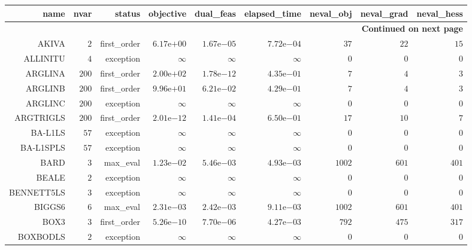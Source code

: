 \begin{longtable}{rrrrrrrrr}
\hline
name & nvar & status & objective & dual\_feas & elapsed\_time & neval\_obj & neval\_grad & neval\_hess \\\hline
\endhead
\hline
\multicolumn{9}{r}{{\bfseries Continued on next page}}\\
\hline
\endfoot
\endlastfoot
AKIVA & \(     2\) & first\_order & \( 6.17\)e\(+00\) & \( 1.67\)e\(-05\) & \( 7.72\)e\(-04\) & \(    37\) & \(    22\) & \(    15\) \\
ALLINITU & \(     4\) & exception & \(\infty\) & \(\infty\) & \(\infty\) & \(     0\) & \(     0\) & \(     0\) \\
ARGLINA & \(   200\) & first\_order & \( 2.00\)e\(+02\) & \( 1.78\)e\(-12\) & \( 4.35\)e\(-01\) & \(     7\) & \(     4\) & \(     3\) \\
ARGLINB & \(   200\) & first\_order & \( 9.96\)e\(+01\) & \( 6.21\)e\(-02\) & \( 4.29\)e\(-01\) & \(     7\) & \(     4\) & \(     3\) \\
ARGLINC & \(   200\) & exception & \(\infty\) & \(\infty\) & \(\infty\) & \(     0\) & \(     0\) & \(     0\) \\
ARGTRIGLS & \(   200\) & first\_order & \( 2.01\)e\(-12\) & \( 1.41\)e\(-04\) & \( 6.50\)e\(-01\) & \(    17\) & \(    10\) & \(     7\) \\
BA-L1LS & \(    57\) & exception & \(\infty\) & \(\infty\) & \(\infty\) & \(     0\) & \(     0\) & \(     0\) \\
BA-L1SPLS & \(    57\) & exception & \(\infty\) & \(\infty\) & \(\infty\) & \(     0\) & \(     0\) & \(     0\) \\
BARD & \(     3\) & max\_eval & \( 1.23\)e\(-02\) & \( 5.46\)e\(-03\) & \( 4.93\)e\(-03\) & \(  1002\) & \(   601\) & \(   401\) \\
BEALE & \(     2\) & exception & \(\infty\) & \(\infty\) & \(\infty\) & \(     0\) & \(     0\) & \(     0\) \\
BENNETT5LS & \(     3\) & exception & \(\infty\) & \(\infty\) & \(\infty\) & \(     0\) & \(     0\) & \(     0\) \\
BIGGS6 & \(     6\) & max\_eval & \( 2.31\)e\(-03\) & \( 2.42\)e\(-03\) & \( 9.11\)e\(-03\) & \(  1002\) & \(   601\) & \(   401\) \\
BOX3 & \(     3\) & first\_order & \( 5.26\)e\(-10\) & \( 7.70\)e\(-06\) & \( 4.27\)e\(-03\) & \(   792\) & \(   475\) & \(   317\) \\
BOXBODLS & \(     2\) & exception & \(\infty\) & \(\infty\) & \(\infty\) & \(     0\) & \(     0\) & \(     0\) \\

\end{longtable}
